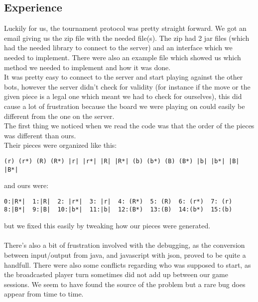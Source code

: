 \documentclass[12pt, a4paper]{article}
\begin{document}
\subsection{Experience}
Luckily for us, the tournament protocol was pretty straight forward. We got an email giving us the zip file with the needed file(s). The zip had 2 jar files (which had the needed library to connect to the server) and an interface which we needed to implement. There were also an example file which showed us which method we needed to implement and how it was done. \\
It was pretty easy to connect to the server and start playing against the other bots, however the server didn't check for validity (for instance if the move or the given piece is a legal one which meant we had to check for ourselves), this did cause a lot of frustration because the board we were playing on could easily be different from the one on the server. \\
The first thing we noticed when we read the code was that the order of the pieces was different than ours.\\
Their pieces were organized like this:
\begin{verbatim}
(r) (r*) (R) (R*) |r| |r*| |R| |R*| (b) (b*) (B) (B*) |b| |b*| |B| |B*|
\end{verbatim}
and ours were:
\begin{verbatim}
0:|R*|  1:|R|  2: |r*|  3: |r|  4: (R*)  5: (R)  6: (r*)  7: (r)
8:|B*|  9:|B|  10:|b*|  11:|b|  12:(B*)  13:(B)  14:(b*)  15:(b)
\end{verbatim}
but we fixed this easily by tweaking how our pieces were generated.\\ \\
There's also a bit of frustration involved with the debugging, as the conversion between input/output from java, and javascript with json, proved to be quite a handfull. There were also some conflicts regarding who was supposed to start, as the broadcasted player turn sometimes did not add up between our game sessions. We seem to have found the source of the problem but a rare bug does appear from time to time. 
\end{document}
